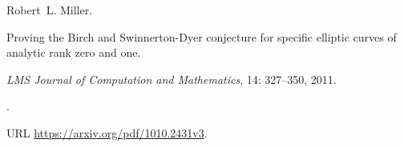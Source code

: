 Robert~L. Miller.

\newblock Proving the {Birch} and {Swinnerton-Dyer} conjecture for specific
  elliptic curves of analytic rank zero and one.

\newblock \emph{LMS Journal of Computation and Mathematics}, 14:
  327--350, 2011.

\newblock {}.

\newblock URL \url{https://arxiv.org/pdf/1010.2431v3}.
